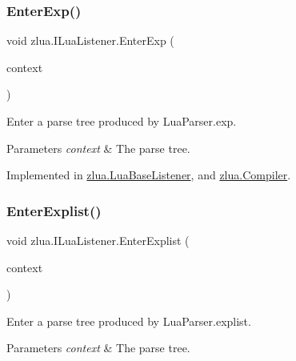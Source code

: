 \subsubsection{\texorpdfstring{Enter\+Exp()}{EnterExp()}}
{\footnotesize\ttfamily void zlua.\+I\+Lua\+Listener.\+Enter\+Exp (\begin{DoxyParamCaption}\item[{\mbox{[}\+Not\+Null\mbox{]} \mbox{\hyperlink{classzlua_1_1_lua_parser_1_1_exp_context}{Lua\+Parser.\+Exp\+Context}}}]{context }\end{DoxyParamCaption})}



Enter a parse tree produced by Lua\+Parser.\+exp. 


\begin{DoxyParams}{Parameters}
{\em context} & The parse tree.\\
\hline
\end{DoxyParams}


Implemented in \mbox{\hyperlink{classzlua_1_1_lua_base_listener_a7a7e4ba1a91e217503b568da1213eaf4}{zlua.\+Lua\+Base\+Listener}}, and \mbox{\hyperlink{classzlua_1_1_compiler_a602f2e28904cb93674d854f543cff30b}{zlua.\+Compiler}}.

\mbox{\label{interfacezlua_1_1_i_lua_listener_a9e310e407a85f410ec1e17d632778708}} 
\subsubsection{\texorpdfstring{Enter\+Explist()}{EnterExplist()}}
{\footnotesize\ttfamily void zlua.\+I\+Lua\+Listener.\+Enter\+Explist (\begin{DoxyParamCaption}\item[{\mbox{[}\+Not\+Null\mbox{]} \mbox{\hyperlink{classzlua_1_1_lua_parser_1_1_explist_context}{Lua\+Parser.\+Explist\+Context}}}]{context }\end{DoxyParamCaption})}



Enter a parse tree produced by Lua\+Parser.\+explist. 


\begin{DoxyParams}{Parameters}
{\em context} & The parse tree.\\
\hline
\end{DoxyParams}


